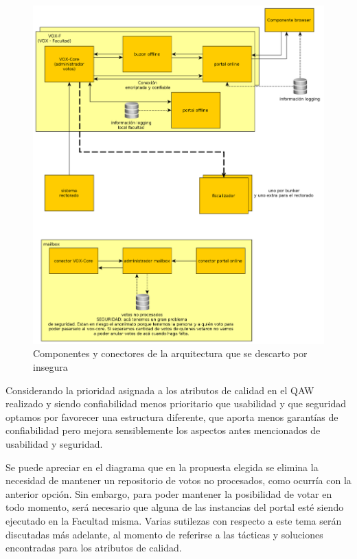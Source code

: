 \begin{figure}[H]
	\begin{center}
		\includegraphics[scale=0.26]{../diagramas/arquitecturaInsegura.png}
		\caption{Componentes y conectores de la arquitectura que se descarto por insegura}
	\end{center} 
\end{figure}

Considerando la prioridad asignada a los atributos de calidad en el QAW realizado y siendo confiabilidad menos prioritario que usabilidad y que seguridad optamos por favorecer una estructura diferente, que aporta menos garantías de confiabilidad pero mejora sensiblemente los aspectos antes mencionados de usabilidad y seguridad.

Se puede apreciar en el diagrama %
que en la propuesta elegida se elimina la necesidad de mantener un repositorio de votos no procesados, como ocurría con la anterior opción. Sin embargo, para poder mantener la posibilidad de votar en todo momento, será necesario que alguna de las instancias del portal esté siendo ejecutado en la Facultad misma. Varias sutilezas con respecto a este tema serán discutadas más adelante, %
al momento de referirse a las tácticas y soluciones encontradas para los atributos de calidad.


